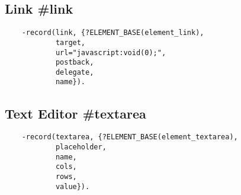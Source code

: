 \subsection{Link {\bf \#link}}

\vspace{1\baselineskip}
\begin{lstlisting}
    -record(link, {?ELEMENT_BASE(element_link),
            target,
            url="javascript:void(0);",
            postback,
            delegate,
            name}).
\end{lstlisting}
\vspace{1\baselineskip}

\subsection{Text Editor {\bf \#textarea}}

\vspace{1\baselineskip}
\begin{lstlisting}
    -record(textarea, {?ELEMENT_BASE(element_textarea),
            placeholder,
            name,
            cols,
            rows,
            value}).
\end{lstlisting}
\vspace{1\baselineskip}
